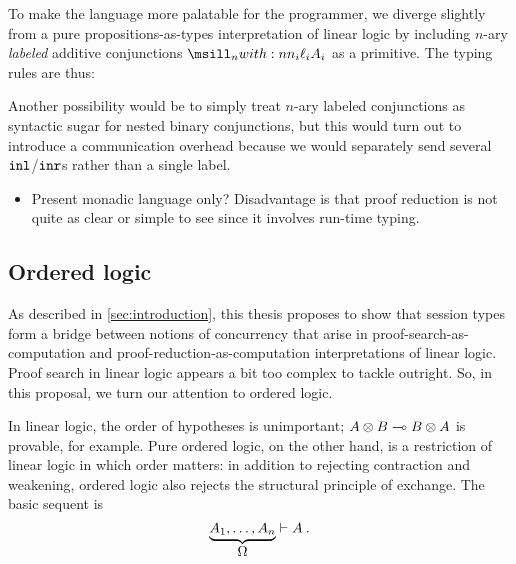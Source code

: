 To make the language more palatable for the programmer, we diverge slightly from a pure propositions-as-types interpretation of linear logic by including $n$-ary \emph{labeled} additive conjunctions $\nwith[_i]{{\ell_i}{A_i}}$ as a primitive.
The typing rules are thus:
Another possibility would be to simply treat $n$-ary labeled conjunctions as syntactic sugar for nested binary conjunctions, but this would turn out to introduce a communication overhead because we would separately send several $\mathtt{in}\mathtt{l}$/$\mathtt{in}\mathtt{r}$s rather than a single label.



\begin{itemize}
\item Present monadic language only?  Disadvantage is that proof reduction is not quite as clear or simple to see since it involves run-time typing.
\end{itemize}





\subsection{Ordered logic}\label{sec:ordered-logic}

As described in \cref{sec:introduction}, this thesis proposes to show that session types form a bridge between notions of concurrency that arise in proof-search-as-computation and proof-reduction-as-computation interpretations of linear logic.
Proof search in linear logic appears a bit too complex to tackle outright.
So, in this proposal, we turn our attention to ordered logic.

In linear logic, the order of hypotheses is unimportant; $A \otimes B \multimap B \otimes A$ is provable, for example.
Pure ordered logic, on the other hand, is a restriction of linear logic in which order matters:
in addition to rejecting contraction and weakening, ordered logic also rejects the structural principle of exchange.
The basic sequent is
\begin{equation*}
  \underbrace{A_1, \dotsc, A_n}_{\displaystyle \Omega} \vdash A \:.
\end{equation*}

